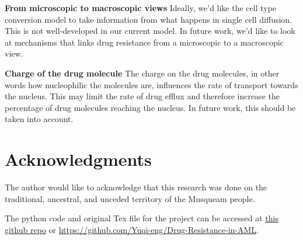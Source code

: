 \documentclass{edm_article}
\begin{document}
\textbf{From microscopic to macroscopic views} Ideally, we'd like the cell type conversion model to take information from what happens in single cell diffusion. This is not well-developed in our current model. In future work, we'd like to look at mechanisms that links drug resistance from a microscopic to a macroscopic view. 

\textbf{Charge of the drug molecule} The charge on the drug molecules, in other words how nucleophilic the molecules are, influences the rate of transport towards the nucleus. This may limit the rate of drug efflux and therefore increase the percentage of drug molecules reaching the nucleus. In future work, this should be taken into account. 

\section{Acknowledgments}
The author would like to acknowledge that this research was done on the traditional, ancestral, and unceded territory of the Musqueam people.

%



\begin{appendix}
The python code and original Tex file for the project can be accessed at \href{https://github.com/Yuqi-eng/Drug-Resistance-in-AML}{this github repo} or \url{https://github.com/Yuqi-eng/Drug-Resistance-in-AML}.
\end{appendix}
\end{document}
